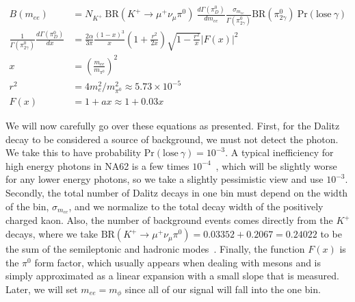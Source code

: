 \begin{align}
\label{eqn:kaon_dalitz_background}
B(m_{ee}) &= N_{K^+}~\textrm{BR}(K^+ \rightarrow \mu^+ \nu_\mu \pi^0)~\frac{d\Gamma(\pi^0_D)}{d m_{ee}} \frac{\sigma_{m_{ee}}}{\Gamma(\pi^0_{2\gamma})} \textrm{BR}(\pi^0_{2\gamma})~\textrm{Pr}(\textrm{lose}~\gamma) \\
\frac{1}{\Gamma(\pi^0_{2\gamma})} \frac{d\Gamma(\pi^0_D)}{dx} &= \frac{2\alpha}{3\pi} \frac{(1-x)^3}{x}(1+\frac{r^2}{2x})\sqrt{1-\frac{r^2}{x}}\left|F(x)\right|^2 \\
x &= \left(\frac{m_{ee}}{m_{\pi^0}}\right)^2 \\
r^2 &= 4 m_e^2 / m_{\pi^0}^2 \approx 5.73\times 10^{-5} \\
F(x) &= 1 + ax \approx 1+0.03x
\end{align}

We will now carefully go over these equations as presented.
First, for the Dalitz decay to be considered a source of background, we must not detect the photon.
We take this to have probability $\textrm{Pr}(\textrm{lose}~\gamma) = 10^{-3}$.
A typical inefficiency for high energy photons in NA62 is a few times $10^{-4}$~\cite{Martellotti:2015kna}, which will be slightly worse for any lower energy photons, so we take a slightly pessimistic view and use $10^{-3}$.
Secondly, the total number of Dalitz decays in one bin must depend on the width of the bin, $\sigma_{m_{ee}}$, and we normalize to the total decay width of the positively charged kaon.
Also, the number of background events comes directly from the $K^+$ decays, where we take $\textrm{BR}(K^+ \rightarrow \mu^+ \nu_\mu \pi^0) = 0.03352 + 0.2067 = 0.24022$ to be the sum of the semileptonic and hadronic modes~\cite{Agashe:2014kda}.
Finally, the function $F(x)$ is the $\pi^0$ form factor, which usually appears when dealing with mesons and is simply approximated as a linear expansion with a small slope that is measured.
Later, we will set $m_{ee} = m_\phi$ since all of our signal will fall into the one bin.

